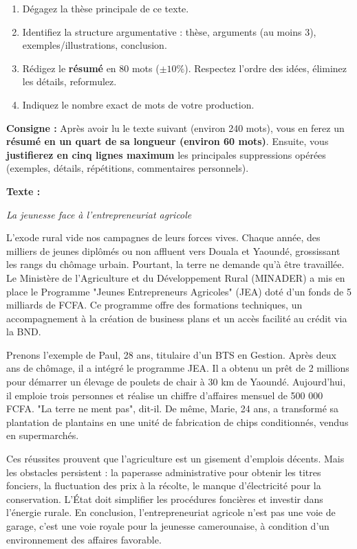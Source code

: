 \documentclass[11pt]{article}
\newcommand{\cle}[1]{{\popxbold\color{popdark}#1}}
\begin{document}
\begin{exercice}
\begin{enumerate}
    \item Dégagez la \cle{thèse} principale de ce texte.
    \item Identifiez la \cle{structure argumentative} : thèse, arguments (au moins 3), exemples/illustrations, conclusion.
    \item Rédigez le \textbf{résumé} en 80 mots ($\pm 10\%$). Respectez l'ordre des idées, éliminez les détails, reformulez.
    \item Indiquez le nombre exact de mots de votre production.
\end{enumerate}
\end{exercice}

\begin{exercice}
\textbf{Consigne :} Après avoir lu le texte suivant (environ 240 mots), vous en ferez un \textbf{résumé en un quart de sa longueur (environ 60 mots)}. Ensuite, vous \textbf{justifierez en cinq lignes maximum} les principales suppressions opérées (exemples, détails, répétitions, commentaires personnels).

\textbf{Texte :}

\textit{La jeunesse face à l'entrepreneuriat agricole}

L'exode rural vide nos campagnes de leurs forces vives. Chaque année, des milliers de jeunes diplômés ou non affluent vers Douala et Yaoundé, grossissant les rangs du chômage urbain. Pourtant, la terre ne demande qu'à être travaillée. Le Ministère de l'Agriculture et du Développement Rural (MINADER) a mis en place le Programme "Jeunes Entrepreneurs Agricoles" (JEA) doté d'un fonds de 5 milliards de FCFA. Ce programme offre des formations techniques, un accompagnement à la création de business plans et un accès facilité au crédit via la BND.

Prenons l'exemple de Paul, 28 ans, titulaire d'un BTS en Gestion. Après deux ans de chômage, il a intégré le programme JEA. Il a obtenu un prêt de 2 millions pour démarrer un élevage de poulets de chair à 30 km de Yaoundé. Aujourd'hui, il emploie trois personnes et réalise un chiffre d'affaires mensuel de 500 000 FCFA. "La terre ne ment pas", dit-il. De même, Marie, 24 ans, a transformé sa plantation de plantains en une unité de fabrication de chips conditionnés, vendus en supermarchés.

Ces réussites prouvent que l'agriculture est un gisement d'emplois décents. Mais les obstacles persistent : la paperasse administrative pour obtenir les titres fonciers, la fluctuation des prix à la récolte, le manque d'électricité pour la conservation. L'État doit simplifier les procédures foncières et investir dans l'énergie rurale. En conclusion, l'entrepreneuriat agricole n'est pas une voie de garage, c'est une voie royale pour la jeunesse camerounaise, à condition d'un environnement des affaires favorable.


\end{exercice}
\end{document}
